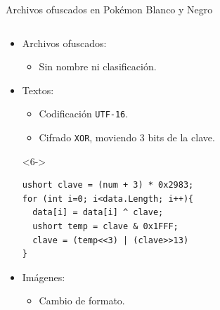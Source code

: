 \begin{frame}[fragile]{Archivos ofuscados en Pokémon Blanco y Negro}
\begin{columns}
\begin{column}{0.75\textwidth}
    \begin{itemize}
        \item<1-> Archivos ofuscados:
        \begin{itemize}
            \item<3-> Sin nombre ni clasificación.
        \end{itemize}

        \item<4-> Textos:
        \begin{itemize}
            \item<5-> Codificación \texttt{UTF-16}.
            \item<6-> Cifrado \texttt{XOR}, moviendo 3 bits de la clave.
        \end{itemize}

    \begin{uncoverenv}<6->\begin{lstlisting}
ushort clave = (num + 3) * 0x2983;
for (int i=0; i<data.Length; i++){
  data[i] = data[i] ^ clave;
  ushort temp = clave & 0x1FFF;
  clave = (temp<<3) | (clave>>13)
}
    \end{lstlisting}\end{uncoverenv}

        \item<7-> Imágenes:
            \begin{itemize}
                \item<8-> Cambio de formato.
            \end{itemize}
    \end{itemize}
\end{column}
\end{columns}
\end{frame}


